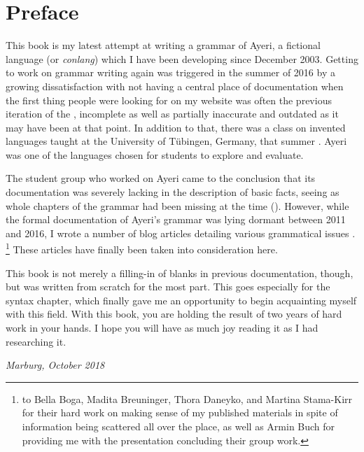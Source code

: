 \chapter{Preface}

This book is my latest attempt at writing a grammar of Ayeri, a fictional
language (or \emph{conlang}) which I have been developing since December
2003. Getting to work on grammar writing again was triggered in the summer of
2016 by a growing dissatisfaction with not having a central place of
documentation when the first thing people were looking for on my website was
often the previous iteration of the , incomplete as well as
partially inaccurate and outdated as it may have been at that point. In
addition to that, there was a class on invented languages taught at the
University of Tübingen, Germany, that summer \autocite{buch2016ss}. Ayeri was
one of the languages chosen for students to explore and evaluate.

The student group who worked on Ayeri came to the conclusion that its
documentation was severely lacking in the description of basic facts, seeing as
whole chapters of the grammar had been missing at the time
(\cite[12]{boga2016}). However, while the formal documentation of Ayeri's
grammar was lying dormant between 2011 and 2016, I wrote a number of blog
articles detailing various grammatical issues \autocite[Blog]{benung}.%
\footnote{ to Bella Boga, Madita
Breuninger, Thora Daneyko, and Martina Stama-Kirr for their hard work on making
sense of my published materials in spite of information being scattered all
over the place, as well as Armin Buch for providing me with the presentation
concluding their group work.} These articles have finally been taken into
consideration here.

This book is not merely a filling-in of blanks in previous documentation,
though, but was written from scratch for the most part. This goes especially
for the syntax chapter, which finally gave me an opportunity to begin
acquainting myself with this field. With this book, you are holding the result
of two years of hard work in your hands. I hope you will have as much joy
reading it as I had researching it.

\begin{flushright}\itshape\footnotesize
Marburg, October 2018
\end{flushright}
